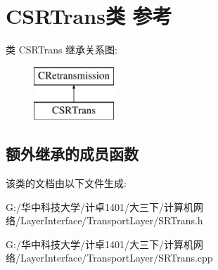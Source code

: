 \hypertarget{class_c_s_r_trans}{}\section{C\+S\+R\+Trans类 参考}
\label{class_c_s_r_trans}
类 C\+S\+R\+Trans 继承关系图\+:\begin{figure}[H]
\begin{center}
\leavevmode
\includegraphics[height=2.000000cm]{class_c_s_r_trans}
\end{center}
\end{figure}
\subsection*{额外继承的成员函数}


该类的文档由以下文件生成\+:\begin{DoxyCompactItemize}
\item 
G\+:/华中科技大学/计卓1401/大三下/计算机网络/\+Layer\+Interface/\+Transport\+Layer/S\+R\+Trans.\+h\item 
G\+:/华中科技大学/计卓1401/大三下/计算机网络/\+Layer\+Interface/\+Transport\+Layer/S\+R\+Trans.\+cpp\end{DoxyCompactItemize}
